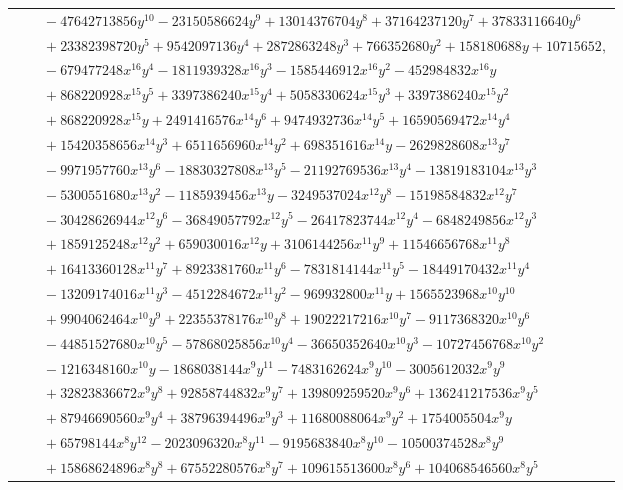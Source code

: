 \documentclass[11pt]{article}
\begin{document}
\begin{longtable}{@{}ll@{}}
 & $\quad -47642713856y^{10}-23150586624y^{9}+13014376704y^{8}+37164237120y^{7}+37833116640y^{6}$\\
 & $\quad +23382398720y^{5}+9542097136y^{4}+2872863248y^{3}+766352680y^{2}+158180688y+10715652,$\\
 & $\quad -679477248x^{16}y^{4}-1811939328x^{16}y^{3}-1585446912x^{16}y^{2}-452984832x^{16}y$\\
 & $\quad +868220928x^{15}y^{5}+3397386240x^{15}y^{4}+5058330624x^{15}y^{3}+3397386240x^{15}y^{2}$\\
 & $\quad +868220928x^{15}y+2491416576x^{14}y^{6}+9474932736x^{14}y^{5}+16590569472x^{14}y^{4}$\\
 & $\quad +15420358656x^{14}y^{3}+6511656960x^{14}y^{2}+698351616x^{14}y-2629828608x^{13}y^{7}$\\
 & $\quad -9971957760x^{13}y^{6}-18830327808x^{13}y^{5}-21192769536x^{13}y^{4}-13819183104x^{13}y^{3}$\\
 & $\quad -5300551680x^{13}y^{2}-1185939456x^{13}y-3249537024x^{12}y^{8}-15198584832x^{12}y^{7}$\\
 & $\quad -30428626944x^{12}y^{6}-36849057792x^{12}y^{5}-26417823744x^{12}y^{4}-6848249856x^{12}y^{3}$\\
 & $\quad +1859125248x^{12}y^{2}+659030016x^{12}y+3106144256x^{11}y^{9}+11546656768x^{11}y^{8}$\\
 & $\quad +16413360128x^{11}y^{7}+8923381760x^{11}y^{6}-7831814144x^{11}y^{5}-18449170432x^{11}y^{4}$\\
 & $\quad -13209174016x^{11}y^{3}-4512284672x^{11}y^{2}-969932800x^{11}y+1565523968x^{10}y^{10}$\\
 & $\quad +9904062464x^{10}y^{9}+22355378176x^{10}y^{8}+19022217216x^{10}y^{7}-9117368320x^{10}y^{6}$\\
 & $\quad -44851527680x^{10}y^{5}-57868025856x^{10}y^{4}-36650352640x^{10}y^{3}-10727456768x^{10}y^{2}$\\
 & $\quad -1216348160x^{10}y-1868038144x^{9}y^{11}-7483162624x^{9}y^{10}-3005612032x^{9}y^{9}$\\
 & $\quad +32823836672x^{9}y^{8}+92858744832x^{9}y^{7}+139809259520x^{9}y^{6}+136241217536x^{9}y^{5}$\\
 & $\quad +87946690560x^{9}y^{4}+38796394496x^{9}y^{3}+11680088064x^{9}y^{2}+1754005504x^{9}y$\\
 & $\quad +65798144x^{8}y^{12}-2023096320x^{8}y^{11}-9195683840x^{8}y^{10}-10500374528x^{8}y^{9}$\\
 & $\quad +15868624896x^{8}y^{8}+67552280576x^{8}y^{7}+109615513600x^{8}y^{6}+104068546560x^{8}y^{5}$\\

\end{longtable}
\end{document}
